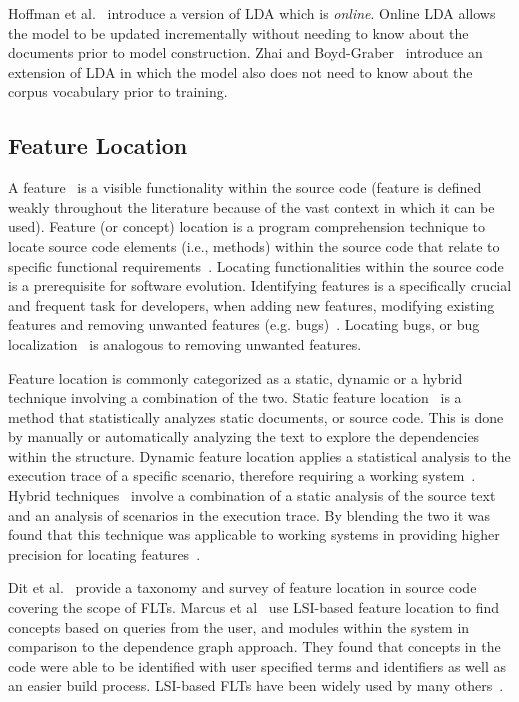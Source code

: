 Hoffman et al.~\cite{Hoffman-etal:2010} introduce a version of LDA which is
\emph{online}.  Online LDA allows the model to be updated incrementally without
needing to know about the documents prior to model construction.  Zhai and
Boyd-Graber~\cite{Zhai-Boyd-Graber:2013} introduce an extension of LDA in which
the model also does not need to know about the corpus vocabulary prior to
training.


\subsection{Feature Location}

A feature~\cite{Biggerstaff-etal:1993} is a visible functionality within the
source code (feature is defined weakly throughout the literature because of the
vast context in which it can be used). Feature (or concept) location is
a program comprehension technique to locate source code elements (i.e., methods)
within the source code that relate to specific functional
requirements~\cite{Eisenbarth-etal:2001, Biggers-etal:2014}. Locating
functionalities within the source code is a prerequisite for software evolution.
Identifying features is a specifically crucial and frequent task for developers,
when adding new features, modifying existing features and removing unwanted
features (e.g.  bugs)~\cite{Rajlich-Gosavi:2004, Dit-etal:2013b}. Locating bugs,
or bug localization~\cite{Lukins-etal:2008, Bassett-Kraft:2013} is analogous to
removing unwanted features.

Feature location is commonly categorized as a static, dynamic or a hybrid
technique involving a combination of the two. Static feature
location~\cite{Zhao-etal:2006} is a method that statistically analyzes static
documents, or source code. This is done by manually or automatically analyzing
the text to explore the dependencies within the structure. Dynamic feature
location applies a statistical analysis to the execution trace of a specific
scenario, therefore requiring a working
system~\cite{Eisenbarth-etal:2001,Poshyvanyk-etal:2007}.  Hybrid
techniques~\cite{Eisenbarth-etal:2003, Eaddy-etal:2008, Revelle-etal:2010}
involve a combination of a static analysis of the source text and an analysis of
scenarios in the execution trace. By blending the two it was found that this
technique was applicable to working systems in providing higher precision for
locating features~\cite{Poshyvanyk-etal:2007, Ernst:2004, Revelle-Coppitt:UNK}.

Dit et al.~\cite{Dit-etal:2013b} provide a taxonomy and survey of feature
location in source code covering the scope of FLTs.  Marcus et
al~\cite{Marcus-etal:2004} use LSI-based feature location to find concepts based
on queries from the user, and modules within the system in comparison to the
dependence graph approach. They found that concepts in the code were able to be
identified with user specified terms and identifiers as well as an easier build
process. LSI-based FLTs have been widely used by many others~\cite{
Poshyvanyk-etal:2006, Poshyvanyk-Marcus:2007, Liu-etal:2007,
Scanniello-Marcus:2011, Eaddy-etal:2008, Cubranic-etal:2005}.

